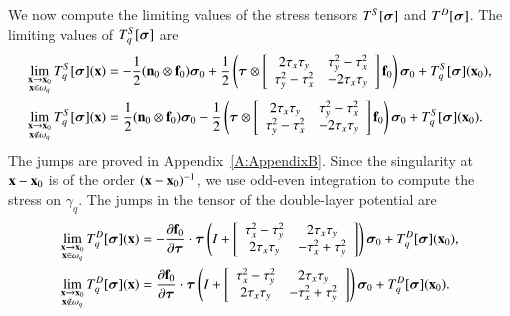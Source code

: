 We now compute the limiting values of the stress tensors
$T^{S}[{\boldsymbol\sigma}]$ and $T^{D}[{\boldsymbol\sigma}]$.  The limiting values of
$T^{S}_{q}[{\boldsymbol\sigma}]$ are
\begin{align}
  \lim_{\substack{{\mathbf{x}} \rightarrow {\mathbf{x}}_{0} \\ {\mathbf{x}} \in \omega_{q}}} 
    T^{S}_{q}[{\boldsymbol\sigma}]({\mathbf{x}}) 
  &=-\frac{1}{2}({\mathbf{n}}_{0} \otimes {\mathbf{f}}_{0}){\boldsymbol\sigma}_{0} +
    \frac{1}{2}\left( {\boldsymbol\tau} \otimes \left[
    \begin{array}{cc}
      2\tau_{x}\tau_{y} & \tau_{y}^{2} - \tau_{x}^{2} \\
      \tau_{y}^{2} - \tau_{x}^{2} & -2\tau_{x}\tau_{y}
    \end{array}
    \right]{\mathbf{f}}_{0} \right) {\boldsymbol\sigma}_{0} + T^{S}_{q}[{\boldsymbol\sigma}]({\mathbf{x}}_{0}), 
    \label{e:stress:jump:int} \\
  \lim_{\substack{{\mathbf{x}} \rightarrow {\mathbf{x}}_{0} \\ {\mathbf{x}} \notin \omega_{q}}} 
    T^{S}_{q}[{\boldsymbol\sigma}]({\mathbf{x}}) 
  &=\frac{1}{2}({\mathbf{n}}_{0} \otimes {\mathbf{f}}_{0}){\boldsymbol\sigma}_{0} -
    \frac{1}{2}\left( {\boldsymbol\tau} \otimes \left[
    \begin{array}{cc}
      2\tau_{x}\tau_{y} & \tau_{y}^{2} - \tau_{x}^{2} \\
      \tau_{y}^{2} - \tau_{x}^{2} & -2\tau_{x}\tau_{y}
    \end{array}
    \right]{\mathbf{f}}_{0} \right) {\boldsymbol\sigma}_{0} + T^{S}_{q}[{\boldsymbol\sigma}]({\mathbf{x}}_{0}).
    \label{e:stress:jump:ext}
\end{align}
The jumps are proved in Appendix~\ref{A:AppendixB}.  Since the
singularity at ${\mathbf{x}}-{\mathbf{x}}_{0}$ is of the order $({\mathbf{x}} - {\mathbf{x}}_{0})^{-1}$, we
use odd-even integration to compute the stress on $\gamma_{q}$.  The
jumps in the tensor of the double-layer potential are
\begin{align*}
  \lim_{\substack{{\mathbf{x}} \rightarrow {\mathbf{x}}_{0} \\ {\mathbf{x}} \in \omega_{q}}} 
    T^{D}_{q}[{\boldsymbol\sigma}]({\mathbf{x}}) &= -\frac{\partial {\mathbf{f}}_{0}}{\partial {\boldsymbol\tau}} \cdot {\boldsymbol\tau}
    \left(I + \left[
    \begin{array}{cc}
      \tau_{x}^{2}-\tau_{y}^{2} & 2\tau_{x}\tau_{y} \\
      2\tau_{x}\tau_{y} & -\tau_{x}^{2} + \tau_{y}^{2}
    \end{array}
    \right] \right) {\boldsymbol\sigma}_{0} + T^{D}_{q}[{\boldsymbol\sigma}]({\mathbf{x}}_{0}),
  \\
  \lim_{\substack{{\mathbf{x}} \rightarrow {\mathbf{x}}_{0} \\ {\mathbf{x}} \notin \omega_{q}}} 
    T^{D}_{q}[{\boldsymbol\sigma}]({\mathbf{x}}) &= \frac{\partial {\mathbf{f}}_{0}}{\partial {\boldsymbol\tau}} \cdot {\boldsymbol\tau}
    \left(I + \left[
    \begin{array}{cc}
      \tau_{x}^{2}-\tau_{y}^{2} & 2\tau_{x}\tau_{y} \\
      2\tau_{x}\tau_{y} & -\tau_{x}^{2} + \tau_{y}^{2}
    \end{array}
    \right] \right) {\boldsymbol\sigma}_{0} + T^{D}_{q}[{\boldsymbol\sigma}]({\mathbf{x}}_{0}).
\end{align*}
